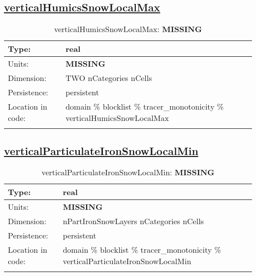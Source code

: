 \subsection[verticalHumicsSnowLocalMax]{\hyperref[sec:var_tab_tracer_monotonicity]{verticalHumicsSnowLocalMax}}
\label{subsec:var_sec_tracer_monotonicity_verticalHumicsSnowLocalMax}
\begin{center}
\begin{longtable}{| p{2.0in} | p{4.0in} |}
        \hline 
        Type: & real \\
        \hline 
        Units: & {\bf \color{red} MISSING} \\
        \hline 
        Dimension: & TWO nCategories nCells \\
        \hline 
        Persistence: & persistent \\
        \hline 
         Location in code: & domain \% blocklist \% tracer\_monotonicity \% verticalHumicsSnowLocalMax \\
         \hline 
    \caption{verticalHumicsSnowLocalMax: {\bf \color{red} MISSING}}
\end{longtable}
\end{center}
\subsection[verticalParticulateIronSnowLocalMin]{\hyperref[sec:var_tab_tracer_monotonicity]{verticalParticulateIronSnowLocalMin}}
\label{subsec:var_sec_tracer_monotonicity_verticalParticulateIronSnowLocalMin}
\begin{center}
\begin{longtable}{| p{2.0in} | p{4.0in} |}
        \hline 
        Type: & real \\
        \hline 
        Units: & {\bf \color{red} MISSING} \\
        \hline 
        Dimension: & nPartIronSnowLayers nCategories nCells \\
        \hline 
        Persistence: & persistent \\
        \hline 
         Location in code: & domain \% blocklist \% tracer\_monotonicity \% verticalParticulateIronSnowLocalMin \\
         \hline 
    \caption{verticalParticulateIronSnowLocalMin: {\bf \color{red} MISSING}}
\end{longtable}
\end{center}
